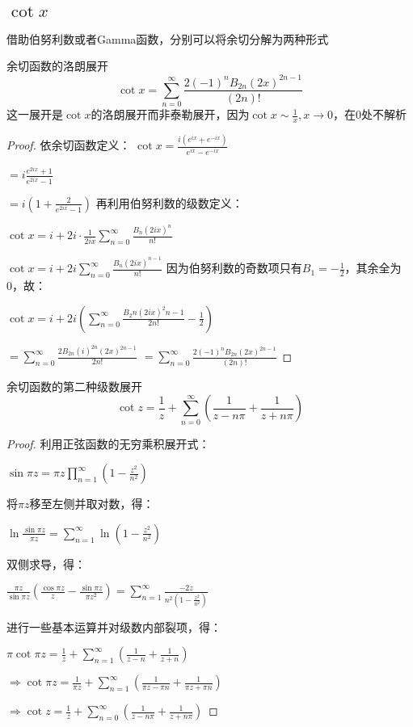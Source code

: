 \documentclass[12pt, a4paper, oneside, UTF8]{ctexbook}
\begin{document}
	\subsection{$\cot x$}
	借助伯努利数或者Gamma函数，分别可以将余切分解为两种形式
	\begin{them}{余切函数的洛朗展开}{}
		\begin{equation}
			\cot x = \sum\limits_{n=0}^{\infty}\frac{2(-1)^n B_{2n} (2x)^{2n-1}}{(2n)!}
		\end{equation}
		这一展开是$\cot x$的洛朗展开而非泰勒展开，因为$\cot x \sim \frac{1}{x},x\to 0$，在0处不解析
	\end{them}
	\begin{proof}
		依余切函数定义：
		$\cot x = \frac{i(e^{ix}+e^{-ix})}{e^{ix}-e^{-ix}}$
		
		$=i\frac{e^{2ix}+1}{e^{2ix}-1}$
		
		$=i\left(1+\frac{2}{e^{2ix}-1}\right)$
		再利用伯努利数的级数定义：
		
		$\cot x = i+2i\cdot \frac{1}{2ix} \sum\limits_{n=0}^{\infty} \frac{B_n (2ix)^n}{n!}$
		
		$\cot x = i+2i\sum\limits_{n=0}^{\infty} \frac{B_n (2ix)^{n-1}}{n!}$
		因为伯努利数的奇数项只有$B_1=-\frac{1}{2}$，其余全为0，故：
		
		$\cot x = i+2i\left(\sum_{n=0}^{\infty} \frac{B_2n (2ix)^2n-1}{2n!} -\frac{1}{2}\right)$
		
		$=\sum\limits_{n=0}^{\infty} \frac{2 B_{2n} (i)^{2n} (2x)^{2n-1}}{2n!}$
		$=\sum\limits_{n=0}^{\infty}\frac{2(-1)^n B_{2n} (2x)^{2n-1}}{(2n)!}$
	\end{proof}
	\begin{them}{余切函数的第二种级数展开}{}
		\begin{equation}
			\cot z = \frac{1}{z}+\sum\limits_{n=0}^{\infty} \left(\frac{1}{z-n\pi}+\frac{1}{z+n\pi}\right)
		\end{equation}
	\end{them}
	\begin{proof}
		利用正弦函数的无穷乘积展开式：
		
		$\sin \pi z = \pi z \prod\limits_{n=1}^{\infty} \left(1-\frac{z^2}{n^2}\right)$
		
		将$\pi z$移至左侧并取对数，得：
		
		$\ln \frac{\sin \pi z}{\pi z} = \sum\limits_{n=1}^{\infty} \ln \left(1-\frac{z^2}{n^2}\right)$
		
		双侧求导，得：
		
		$\frac{\pi z}{\sin \pi z}\left(\frac{\cos \pi z}{z}-\frac{\sin \pi z}{\pi z^2}\right) = \sum\limits_{n=1}^{\infty} \frac{-2z}{n^2 (1-\frac{z^2}{n^2})}$
		
		进行一些基本运算并对级数内部裂项，得：
		
		$\pi \cot \pi z = \frac{1}{z}+\sum\limits_{n=1}^{\infty}\left(\frac{1}{z-n}+\frac{1}{z+n}\right)$
		
		$\Rightarrow \cot \pi z = \frac{1}{\pi z}+\sum\limits_{n=1}^{\infty}\left(\frac{1}{\pi z-\pi n}+\frac{1}{\pi z+\pi n}\right)$
		
		$\Rightarrow \cot z = \frac{1}{z}+\sum\limits_{n=0}^{\infty} \left(\frac{1}{z-n\pi}+\frac{1}{z+n\pi}\right)$
	\end{proof}
\end{document}
